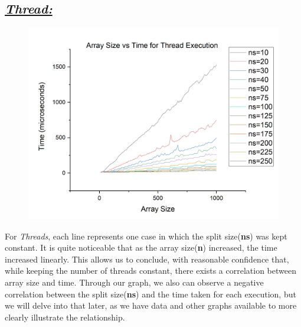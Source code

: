 \documentclass{article}
\begin{document}
            \subsection*{\color{red}\textit{\underline{Thread:}}\color{black}}
                \begin{figure}[H]
                    \centering
                    \includegraphics[width=12cm]{svt-Threads}
                \end{figure}
                For \color{red}\textit{Threads}\color{black}, each line represents one case in which the split size(\textbf{ns}) was kept constant.
                It is quite noticeable that as the array size(\textbf{n}) increased, the time increased linearly. 
                This allows us to conclude, with reasonable confidence that, while keeping the number of threads constant, there exists a correlation between array size and time. \newline
                Through our graph, we also can observe a negative correlation between the split size(\textbf{ns}) and the time taken for each execution, but we will delve into that later, as we have data and other graphs available to more clearly illustrate the relationship.
\end{document}
